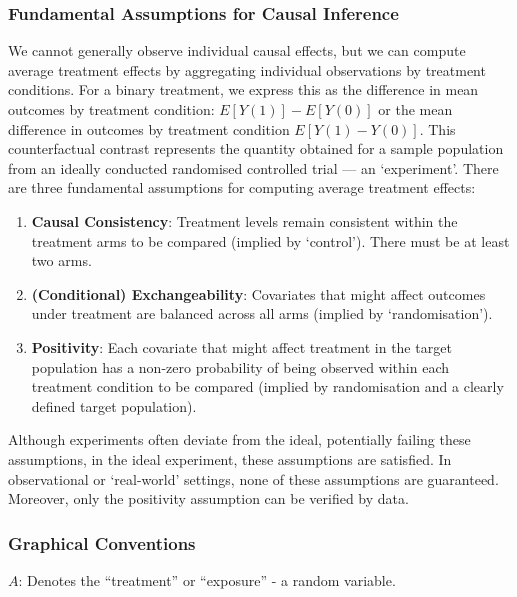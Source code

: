 \documentclass[
  single column]{article}
\providecommand{\tightlist}{%
  \setlength{\itemsep}{0pt}\setlength{\parskip}{0pt}}\usepackage{longtable,booktabs,array}
\begin{document}
\subsubsection{Fundamental Assumptions for Causal
Inference}\label{fundamental-assumptions-for-causal-inference}

We cannot generally observe individual causal effects, but we can
compute average treatment effects by aggregating individual observations
by treatment conditions. For a binary treatment, we express this as the
difference in mean outcomes by treatment condition:
\(E[Y(1)] - E[Y(0)]\) or the mean difference in outcomes by treatment
condition \(E[Y(1) - Y(0)]\). This counterfactual contrast represents
the quantity obtained for a sample population from an ideally conducted
randomised controlled trial --- an `experiment'. There are three
fundamental assumptions for computing average treatment effects:

\begin{enumerate}
\def\labelenumi{\arabic{enumi}.}
\tightlist
\item
  \textbf{Causal Consistency}: Treatment levels remain consistent within
  the treatment arms to be compared (implied by `control'). There must
  be at least two arms.
\item
  \textbf{(Conditional) Exchangeability}: Covariates that might affect
  outcomes under treatment are balanced across all arms (implied by
  `randomisation').
\item
  \textbf{Positivity}: Each covariate that might affect treatment in the
  target population has a non-zero probability of being observed within
  each treatment condition to be compared (implied by randomisation and
  a clearly defined target population).
\end{enumerate}

Although experiments often deviate from the ideal, potentially failing
these assumptions, in the ideal experiment, these assumptions are
satisfied. In observational or `real-world' settings, none of these
assumptions are guaranteed. Moreover, only the positivity assumption can
be verified by data.

\subsubsection{Graphical Conventions}\label{graphical-conventions}

\textbf{\(A\)}: Denotes the ``treatment'' or ``exposure'' - a random
variable.
\end{document}
